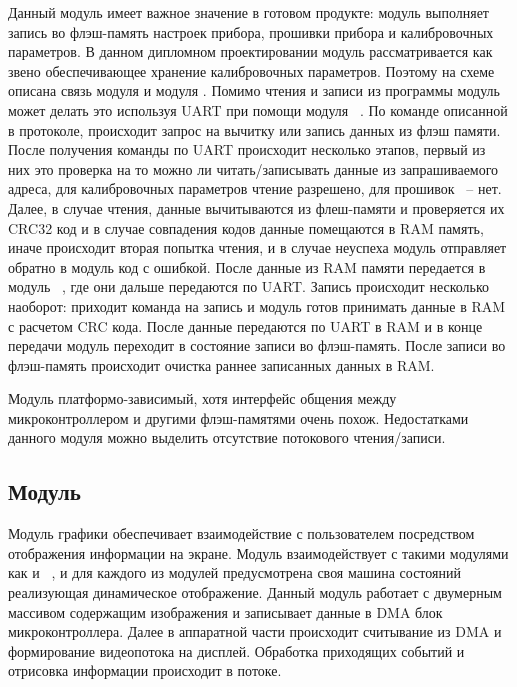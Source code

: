 Данный модуль имеет важное значение в готовом продукте: модуль \moduleFlashMemory выполняет запись во флэш-память настроек прибора,
прошивки прибора и калибровочных параметров. В данном дипломном проектировании модуль \moduleFlashMemory рассматривается как звено
обеспечивающее хранение калибровочных параметров. Поэтому на схеме описана связь модуля \moduleFlashMemory и модуля \moduleCalib.
Помимо чтения и записи из программы модуль может делать это используя UART при помощи модуля \moduleUart~.
По команде описанной в протоколе, происходит запрос на вычитку или запись данных из флэш памяти.
После получения команды по UART происходит несколько этапов, первый из них это проверка на то можно ли читать/записывать данные из запрашиваемого адреса,
для калибровочных параметров чтение разрешено, для прошивок ~-- нет. Далее, в случае чтения, данные вычитываются из флеш-памяти и проверяется их CRC32
код и в случае совпадения кодов данные помещаются в RAM память, иначе происходит вторая попытка чтения, и в случае неуспеха модуль отправляет обратно в 
модуль \moduleUart код с ошибкой. После данные из RAM памяти передается в модуль \moduleUart~, где они дальше передаются по UART. Запись происходит несколько наоборот:
приходит команда на запись и модуль \moduleFlashMemory готов принимать данные в RAM с расчетом CRC кода. После данные передаются по UART в RAM и в конце передачи модуль переходит в состояние
записи во флэш-память. После записи во флэш-память происходит очистка раннее записанных данных в RAM.

Модуль платформо-зависимый, хотя интерфейс общения между микроконтроллером и другими 
флэш-памятями очень похож. Недостатками данного модуля можно выделить отсутствие потокового чтения/записи.


\subsection{Модуль \moduleGraphics}

Модуль графики обеспечивает взаимодействие с пользователем посредством отображения информации на экране.
Модуль взаимодействует с такими модулями как \moduleOrientationAzimuth и \moduleFindTarget~, и для каждого из модулей
предусмотрена своя машина состояний реализующая динамическое отображение. Данный модуль работает с двумерным массивом
содержащим изображения и записывает данные в DMA блок микроконтроллера. Далее в аппаратной части происходит считывание из DMA 
и формирование видеопотока на дисплей. Обработка приходящих событий и отрисовка информации происходит в потоке.


